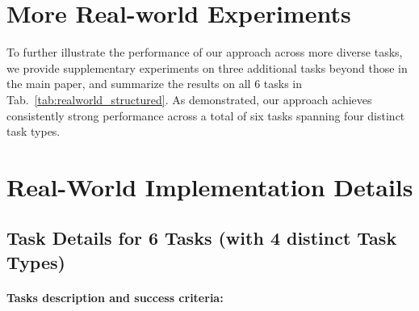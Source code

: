 \documentclass[runningheads]{llncs}
\begin{document}
 \section{More Real-world Experiments}
To further illustrate the performance of our approach across more diverse tasks, we provide supplementary experiments on three additional tasks beyond those in the main paper, and summarize the results on all 6 tasks in Tab.~\ref{tab:realworld_structured}. As demonstrated, our approach achieves consistently strong performance across a total of six tasks spanning four distinct task types.
 
\section{Real-World Implementation Details}
\subsection{Task Details for 6 Tasks (with \textbf{4 distinct} Task Types)}

% 





\paragraph{Tasks description and success criteria:}


    
\end{document}
